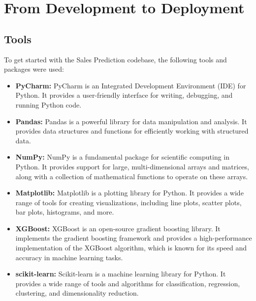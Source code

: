 %
%



\chapter{From Development to Deployment}

\section{Tools}

To get started with the Sales Prediction codebase, the following tools and packages were used:

	\begin{itemize}
		\item \textbf{PyCharm:} PyCharm is an Integrated Development Environment (IDE) for Python. It provides a user-friendly interface for writing, debugging, and running Python code.
		
		\item \textbf{Pandas:} Pandas is a powerful library for data manipulation and analysis. It provides data structures and functions for efficiently working with structured data.
		
		\item \textbf{NumPy:} NumPy is a fundamental package for scientific computing in Python. It provides support for large, multi-dimensional arrays and matrices, along with a collection of mathematical functions to operate on these arrays.
		
		\item \textbf{Matplotlib:} Matplotlib is a plotting library for Python. It provides a wide range of tools for creating visualizations, including line plots, scatter plots, bar plots, histograms, and more.
		
		\item \textbf{XGBoost:} XGBoost is an open-source gradient boosting library. It implements the gradient boosting framework and provides a high-performance implementation of the XGBoost algorithm, which is known for its speed and accuracy in machine learning tasks.
		
		\item \textbf{scikit-learn:} Scikit-learn is a machine learning library for Python. It provides a wide range of tools and algorithms for classification, regression, clustering, and dimensionality reduction.
	\end{itemize}

